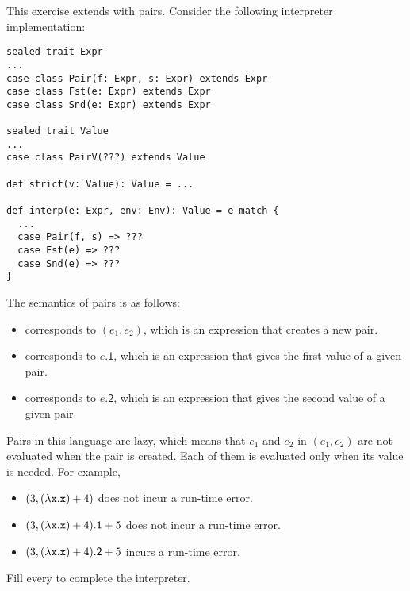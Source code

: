 \begin{exercise}

This exercise extends \lang with pairs. Consider the following interpreter
implementation:

\begin{verbatim}
sealed trait Expr
...
case class Pair(f: Expr, s: Expr) extends Expr
case class Fst(e: Expr) extends Expr
case class Snd(e: Expr) extends Expr

sealed trait Value
...
case class PairV(???) extends Value

def strict(v: Value): Value = ...

def interp(e: Expr, env: Env): Value = e match {
  ...
  case Pair(f, s) => ???
  case Fst(e) => ???
  case Snd(e) => ???
}
\end{verbatim}

The semantics of pairs is as follows:
\begin{itemize}
  \item {} corresponds to $(e_1, e_2)$, which is an
    expression that creates a new pair.
  \item {} corresponds to $e\textsf{.1}$, which is an expression
    that gives the first value of a given pair.
  \item {} corresponds to $e\textsf{.2}$, which is an expression
    that gives the second value of a given pair.
\end{itemize}

Pairs in this language are lazy, which means that $e_1$ and $e_2$ in
$(e_1, e_2)$ are not evaluated when the pair is created.
Each of them is evaluated only when its value is needed. For example,
\begin{itemize}
  \item $(3, (\lambda\texttt{x}.\texttt{x})+4)$ does not incur a run-time error.
  \item $(3, (\lambda\texttt{x}.\texttt{x})+4)\textsf{.1}+5$ does not incur a run-time error.
  \item $(3, (\lambda\texttt{x}.\texttt{x})+4)\textsf{.2}+5$ incurs a run-time error.
\end{itemize}

Fill every  to complete the interpreter.

\end{exercise}

